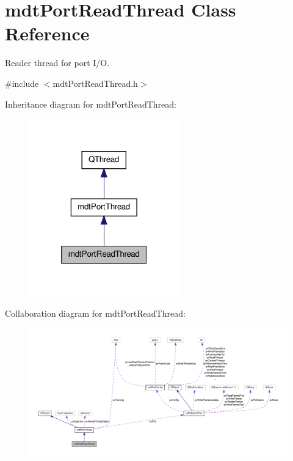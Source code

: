 \hypertarget{classmdt_port_read_thread}{\section{mdt\-Port\-Read\-Thread Class Reference}
\label{classmdt_port_read_thread}
}


Reader thread for port I/\-O.  




{\ttfamily \#include $<$mdt\-Port\-Read\-Thread.\-h$>$}



Inheritance diagram for mdt\-Port\-Read\-Thread\-:\nopagebreak
\begin{figure}[H]
\begin{center}
\leavevmode
\includegraphics[width=184pt]{classmdt_port_read_thread__inherit__graph}
\end{center}
\end{figure}


Collaboration diagram for mdt\-Port\-Read\-Thread\-:\nopagebreak
\begin{figure}[H]
\begin{center}
\leavevmode
\includegraphics[width=350pt]{classmdt_port_read_thread__coll__graph}
\end{center}
\end{figure}

